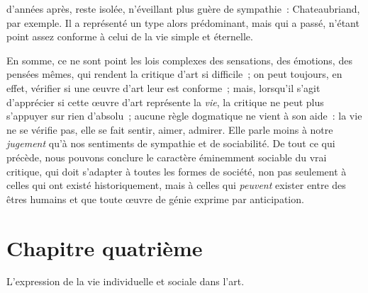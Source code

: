 \documentclass[french,twoside]{book} %
\newcommand\chapteropen{} %
\newcommand\chapterclose{} %
\begin{document}
d’années après, reste isolée, n’éveillant plus guère de sympathie : Chateaubriand, par exemple. Il a représenté un type alors prédominant, mais qui a passé, n’étant point assez conforme à celui de la vie simple et éternelle.\par
En somme, ce ne sont point les lois complexes des sensations, des émotions, des pensées mêmes, qui rendent la critique d’art si difficile ; on peut toujours, en effet, vérifier si une œuvre d’art leur est conforme ; mais, lorsqu’il s’agit d’apprécier si cette œuvre d’art représente la \emph{vie}, la critique ne peut plus s’appuyer sur rien d’absolu ; aucune règle dogmatique ne vient à son aide : la vie ne se vérifie pas, elle se fait sentir, aimer, admirer. Elle parle moins à notre \emph{jugement} qu’à nos sentiments de sympathie et de sociabilité. De tout ce qui précède, nous pouvons conclure le caractère éminemment sociable du vrai critique, qui doit s’adapter à toutes les formes de société, non pas seulement à celles qui ont existé historiquement, mais à celles qui \emph{peuvent} exister entre des êtres humains et que toute œuvre de génie exprime par anticipation.
\chapterclose


\chapteropen
\chapter[{Chapitre quatrième}]{Chapitre quatrième}\renewcommand{\leftmark}{Chapitre quatrième}

\begin{center}L’expression de la vie individuelle et sociale dans l’art.\end{center}
\end{document}
